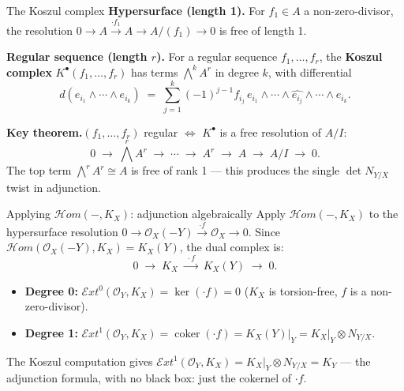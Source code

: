 \documentclass[aspectratio=169,12pt]{beamer}
\newenvironment{mathbox}{%
  \begin{tcolorbox}[mathbox]}{%
  \end{tcolorbox}}
\begin{document}

\begin{frame}{The Koszul complex}
  \textbf{Hypersurface (length 1).}\enspace
  For $f_1 \in A$ a non-zero-divisor, the resolution
  $0 \to A \xrightarrow{\cdot f_1} A \to A/(f_1) \to 0$
  is free of length 1.

  \medskip

  \textbf{Regular sequence (length $r$).}\enspace
  For a regular sequence $f_1, \ldots, f_r$, the \textbf{Koszul complex}
  $K^\bullet(f_1,\ldots,f_r)$ has terms $\bigwedge^k A^r$ in degree $k$,
  with differential
  \[
    d(e_{i_1} \wedge \cdots \wedge e_{i_k})
    \;=\; \sum_{j=1}^{k} (-1)^{j-1} f_{i_j}\,
          e_{i_1} \wedge \cdots \wedge \widehat{e_{i_j}} \wedge \cdots \wedge e_{i_k}.
  \]

  \textbf{Key theorem.}\enspace $(f_1,\ldots,f_r)$ regular
  $\Longleftrightarrow$ $K^\bullet$ is a free resolution of $A/I$:
  \[
    0 \;\longrightarrow\; \textstyle\bigwedge^r\! A^r
      \;\longrightarrow\; \cdots
      \;\longrightarrow\; A^r
      \;\longrightarrow\; A
      \;\longrightarrow\; A/I \;\longrightarrow\; 0.
  \]
  The top term $\bigwedge^r\! A^r \cong A$ is free of rank 1 —
  this produces the single $\det N_{Y/X}$ twist in adjunction.
\end{frame}

\begin{frame}{Applying $\mathcal{H}om(-, K_X)$: adjunction algebraically}
  Apply $\mathcal{H}om(-, K_X)$ to the hypersurface resolution
  $0 \to \mathcal{O}_X(-Y) \xrightarrow{\cdot f} \mathcal{O}_X \to 0$.
  Since $\mathcal{H}om(\mathcal{O}_X(-Y), K_X) = K_X(Y)$, the dual complex is:
  \[
    0 \;\longrightarrow\; K_X \;\xrightarrow{\;\cdot f\;}\; K_X(Y)
    \;\longrightarrow\; 0.
  \]

  \begin{itemize}
    \item \textbf{Degree 0:}\enspace
          $\mathcal{E}xt^0(\mathcal{O}_Y, K_X) = \ker(\cdot f) = 0$
          \;($K_X$ is torsion-free, $f$ is a non-zero-divisor).
    \item \textbf{Degree 1:}\enspace
          $\mathcal{E}xt^1(\mathcal{O}_Y, K_X)
          = \operatorname{coker}(\cdot f)
          = K_X(Y)\big|_Y
          = K_X\big|_Y \otimes N_{Y/X}$.
  \end{itemize}

  \medskip

  \begin{mathbox}
    The Koszul computation gives $\mathcal{E}xt^1(\mathcal{O}_Y, K_X)
    = K_X|_Y \otimes N_{Y/X} = K_Y$ — the adjunction formula,
    with no black box: just the cokernel of $\cdot f$.
  \end{mathbox}
\end{frame}
\end{document}
